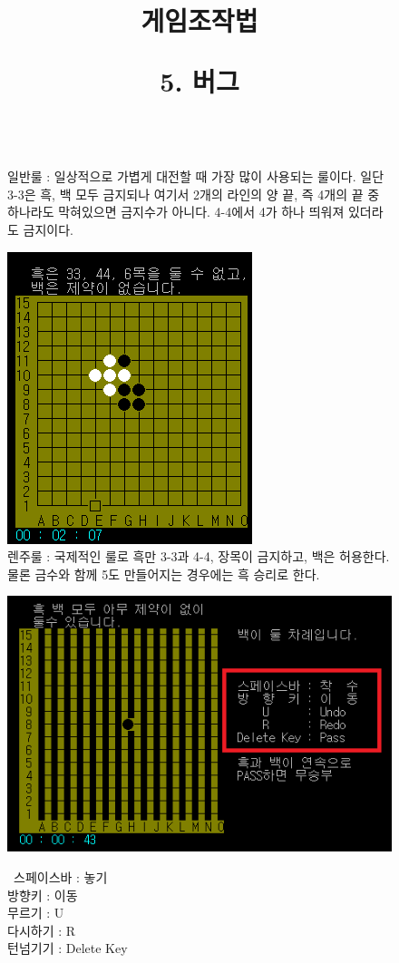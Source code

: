 \documentclass[a4paper, 11pt]{article}
\begin{document}
{\begin{figure}[h]
\begin{center}
			
			\\ 일반룰 : 일상적으로 가볍게 대전할 때 가장 많이 사용되는 룰이다. 일단 3-3은 흑, 백 모두 금지되나 여기서 2개의 라인의 양 끝, 즉 4개의 끝 중 하나라도 막혀있으면 금지수가 아니다. 4-4에서 4가 하나 띄워져 있더라도 금지이다.
		\end{center}
	\end{figure}
	
	\newpage
	\begin{figure}[h] %
		\begin{center}
			\includegraphics[width=0.35\linewidth]{renju.png}
			\\ 렌주룰 : 국제적인 룰로 흑만 3-3과 4-4, 장목이 금지하고, 백은 허용한다. 물론 금수와 함께 5도 만들어지는 경우에는 흑 승리로 한다.
		\end{center}
	\end{figure}
	
	
	\newpage
	\title{게임조작법}
	\begin{figure}[h] %
		\begin{center}
			\includegraphics[width=0.5\linewidth]{OM_5.png}
		\end{center}
		\vspace{0.5cm}
		\ 스페이스바 : 놓기
		\\ 방향키 : 이동
		\\ 무르기 : U
		\\ 다시하기 : R
		\\ 턴넘기기 : Delete Key
	\end{figure}
 \newpage
\title{\textbf{\Huge5. 버그 }
	
}}
\end{document}
